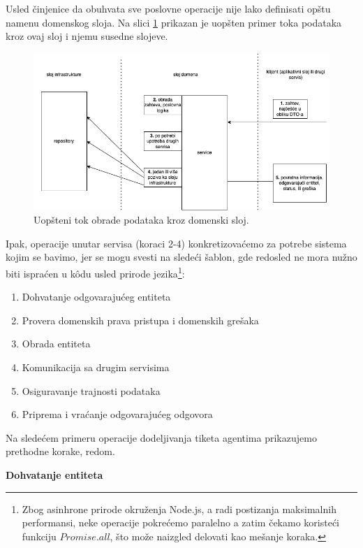 \documentclass[12pt,oneside]{memoir}
\begin{document}
Usled činjenice da obuhvata sve poslovne operacije nije lako definisati opštu namenu domenskog sloja. Na slici \ref{fig:domainlayerdiagram} prikazan je uopšten primer toka podataka kroz ovaj sloj i njemu susedne slojeve.

\begin{figure}[h]
  \centering
  \includegraphics[width=1\textwidth]{docs/images/ch_2/domain.png} 
  \caption{Uopšteni tok obrade podataka kroz domenski sloj.}
  \label{fig:domainlayerdiagram}
\end{figure}

Ipak, operacije unutar servisa (koraci 2-4) konkretizovaćemo za potrebe sistema kojim se bavimo, jer se mogu svesti na sledeći šablon, gde redosled ne mora nužno biti ispraćen u k\^{o}du usled prirode jezika\footnote{Zbog asinhrone prirode okruženja Node.js, a radi postizanja maksimalnih performansi, neke operacije pokrećemo paralelno a zatim čekamo koristeći funkciju $Promise.all$, što može naizgled delovati kao mešanje koraka.}:

\begin{enumerate}
  \item Dohvatanje odgovarajućeg entiteta
  \item Provera domenskih prava pristupa i domenskih grešaka
  \item Obrada entiteta
  \item Komunikacija sa drugim servisima
  \item Osiguravanje trajnosti podataka
  \item Priprema i vraćanje odgovarajućeg odgovora
\end{enumerate}

Na sledećem primeru operacije dodeljivanja tiketa agentima prikazujemo prethodne korake, redom.

\textbf{Dohvatanje entiteta}
\end{document}
